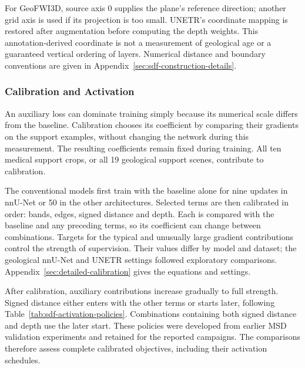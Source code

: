 \documentclass[12pt,a4paper]{article}
\begin{document}
For GeoFWI3D, source axis 0 supplies the plane's reference direction;
another grid axis is used if its projection is too small. UNETR's
coordinate mapping is restored after augmentation before computing
the depth weights. This annotation-derived coordinate is not a
measurement of geological age or a guaranteed vertical ordering of
layers. Numerical distance and boundary conventions are given in
Appendix~\ref{sec:sdf-construction-details}.

\subsubsection{Calibration and Activation}
\label{sec:calibration-methods}

An auxiliary loss can dominate training simply because its numerical
scale differs from the baseline. Calibration chooses its coefficient
by comparing their gradients on the support examples, without changing
the network during this measurement. The resulting coefficients remain
fixed during training. All ten medical support crops, or all 19
geological support scenes, contribute to calibration.

The conventional models first train with the baseline alone for nine
updates in nnU-Net or 50 in the other architectures. Selected terms are
then calibrated in order: bands, edges, signed distance and depth.
Each is compared with the baseline and any preceding terms, so its
coefficient can change between combinations. Targets for the typical
and unusually large gradient contributions control the strength of
supervision. Their values differ by model and dataset; the geological
nnU-Net and UNETR settings followed exploratory comparisons.
Appendix~\ref{sec:detailed-calibration} gives the equations and settings.

After calibration, auxiliary contributions increase gradually to full
strength. Signed distance either enters with the other terms or starts
later, following Table~\ref{tab:sdf-activation-policies}. Combinations
containing both signed distance and depth use the later start. These
policies were developed from earlier MSD validation experiments and
retained for the reported campaigns. The comparisons therefore assess
complete calibrated objectives, including their activation schedules.
\end{document}
